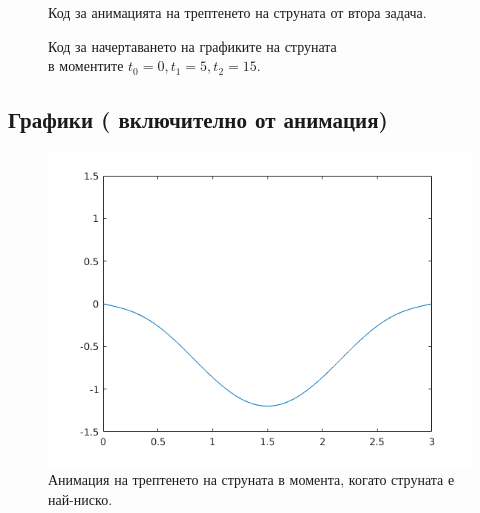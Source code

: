 \documentclass[14pt]{extarticle}
\begin{document}
\begin{figure}[H]
	\begin{quote}
	
	\end{quote}
	\centering
	\caption{Код за анимацията на трептенето на струната от втора задача.}
\end{figure}

\begin{figure}[H]
	\centering
	\captionsetup{justification=centering,margin=2cm}
	\begin{quote}
	
	\end{quote}
	\caption{Код за начертаването на графиките на струната\\в моментите $t_0 = 0, t_1 = 5, t_2 = 15$.}
\end{figure}

\subsection{Графики ( включително от анимация)}

\begin{figure}[H]
	\captionsetup{justification=centering,margin=2cm}
	\centering
	\includegraphics[scale=0.8]{images/task21down}
	\caption{Анимация на трептенето на струната в момента, когато струната е най-ниско.}
\end{figure}
\end{document}
